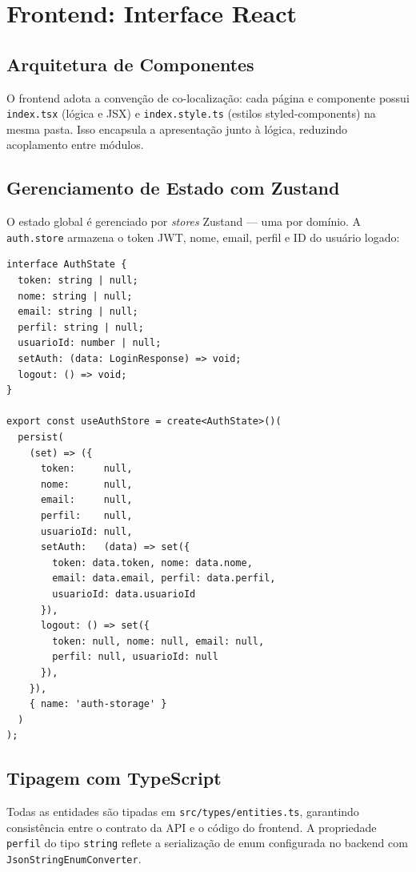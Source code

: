 \documentclass[
  12pt,
  a4paper,
  oneside,
  brazil
]{abntex2}
\begin{document}
\section{Frontend: Interface React}

\subsection{Arquitetura de Componentes}

O frontend adota a convenção de co-localização: cada página e componente possui \texttt{index.tsx} (lógica e JSX) e \texttt{index.style.ts} (estilos styled-components) na mesma pasta. Isso encapsula a apresentação junto à lógica, reduzindo acoplamento entre módulos.

\subsection{Gerenciamento de Estado com Zustand}

O estado global é gerenciado por \textit{stores} Zustand — uma por domínio. A \texttt{auth.store} armazena o token JWT, nome, email, perfil e ID do usuário logado:

\begin{lstlisting}[style=typescript, caption={Auth store — encapsulamento do estado de autenticação}, label=lst:authstore]
interface AuthState {
  token: string | null;
  nome: string | null;
  email: string | null;
  perfil: string | null;
  usuarioId: number | null;
  setAuth: (data: LoginResponse) => void;
  logout: () => void;
}

export const useAuthStore = create<AuthState>()(
  persist(
    (set) => ({
      token:     null,
      nome:      null,
      email:     null,
      perfil:    null,
      usuarioId: null,
      setAuth:   (data) => set({
        token: data.token, nome: data.nome,
        email: data.email, perfil: data.perfil,
        usuarioId: data.usuarioId
      }),
      logout: () => set({
        token: null, nome: null, email: null,
        perfil: null, usuarioId: null
      }),
    }),
    { name: 'auth-storage' }
  )
);
\end{lstlisting}

\subsection{Tipagem com TypeScript}

Todas as entidades são tipadas em \texttt{src/types/entities.ts}, garantindo consistência entre o contrato da API e o código do frontend. A propriedade \texttt{perfil} do tipo \texttt{string} reflete a serialização de enum configurada no backend com \texttt{JsonStringEnumConverter}.
\end{document}
